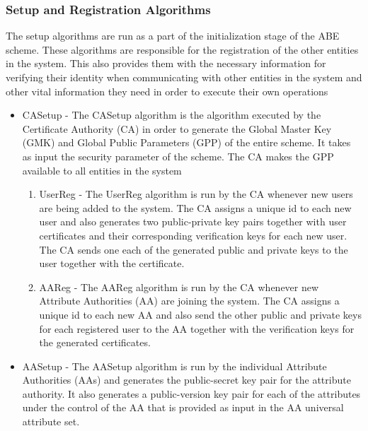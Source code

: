 \subsubsection*{Setup and Registration Algorithms}
The setup algorithms are run as a part of the initialization stage of the ABE scheme. These algorithms are responsible for the registration of the other entities in the system. This also provides them with the necessary information for verifying their identity when communicating with other entities in the system and other vital information they need in order to execute their own operations
\begin{itemize}
	\item CASetup - The CASetup algorithm is the algorithm executed by the Certificate Authority (CA) in order to generate the Global Master Key (GMK) and Global Public Parameters (GPP) of the entire scheme. It takes as input the security parameter of the scheme.  The CA makes the GPP available to all entities in the system
	
	
	\begin{enumerate}
		\item UserReg - The UserReg algorithm is run by the CA whenever new users are being added to the system. The CA assigns a unique id to each new user and also generates two public-private key pairs together with user certificates and their corresponding verification keys for each new user. The CA sends one each of the generated public and private keys to the user together with the certificate.
		
		\item AAReg - The AAReg algorithm is run by the CA whenever new Attribute Authorities (AA) are joining the system. The CA assigns a unique id to each new AA and also send the other public and private keys for each registered user to the AA together with the verification keys for the generated certificates.
		
	\end{enumerate}
	
	\item AASetup - The AASetup algorithm is run by the individual Attribute Authorities (AAs) and generates the public-secret key pair for the attribute authority. It also generates a public-version key pair for each of the attributes under the control of the AA that is provided as input in the AA universal attribute set.
\end{itemize}

